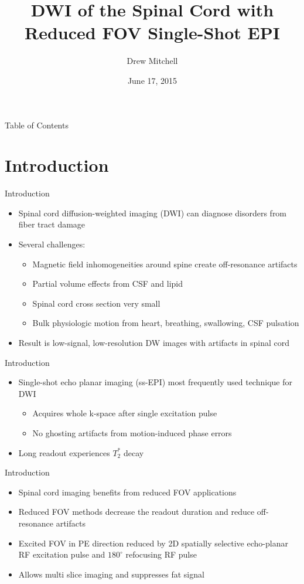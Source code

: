 \documentclass{beamer}
\title[Spinal Cord DWI with ss-EPI]{DWI of the Spinal Cord with Reduced FOV Single-Shot EPI}
\author{Drew Mitchell}
\institute{MD Anderson Cancer Center}
\date{June 17, 2015}
\begin{document}
 
{
\frame{\titlepage}
\begin{frame}{Table of Contents}
\tableofcontents
\end{frame}
}

\section{Introduction}

\begin{frame}{Introduction}
\begin{itemize}
	\item Spinal cord diffusion-weighted imaging (DWI) can diagnose disorders from fiber tract damage
	\item Several challenges:
	\begin{itemize}
		\item Magnetic field inhomogeneities around spine create off-resonance artifacts
		\item Partial volume effects from CSF and lipid
		\item Spinal cord cross section very small
		\item Bulk physiologic motion from heart, breathing, swallowing, CSF pulsation
	\end{itemize}
	\item Result is low-signal, low-resolution DW images with artifacts in spinal cord
\end{itemize}
\end{frame}

\begin{frame}{Introduction}
\begin{itemize}
	\item Single-shot echo planar imaging (ss-EPI) most frequently used technique for DWI
	\begin {itemize}
		\item Acquires whole k-space after single excitation pulse
		\item No ghosting artifacts from motion-induced phase errors
	\end {itemize}
	\item Long readout experiences $T_2^*$ decay
\end{itemize}
\end{frame}

\begin{frame}{Introduction}
\begin{itemize}
	\item Spinal cord imaging benefits from reduced FOV applications
	\item Reduced FOV methods decrease the readout duration and reduce off-resonance artifacts
	\item Excited FOV in PE direction reduced by 2D spatially selective echo-planar RF excitation pulse and $180^{\circ}$ refocusing RF pulse
	\item Allows multi slice imaging and suppresses fat signal
\end{itemize}
\end{frame}
	
\end{document}
